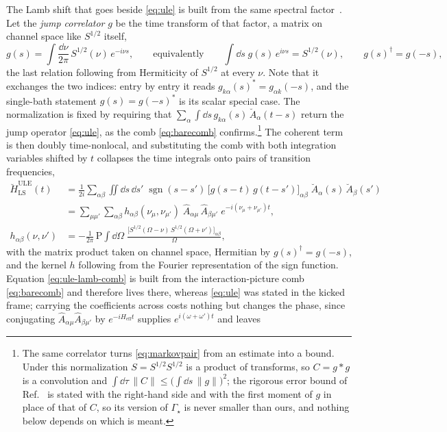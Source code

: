 \documentclass[a4paper,11pt]{article}
\newcommand{\eff}{\mathrm{eff}}
\begin{document}
The Lamb shift that goes beside \eqref{eq:ule} is built from the same spectral factor~\cite{Nathan2020Universal}. Let the \emph{jump correlator} $g$ be the time transform of that factor, a matrix on channel space like $S^{1/2}$ itself,
\begin{equation}\label{eq:jumpcorrelator}
  g(s) = \int\!\frac{\dd\nu}{2\pi}\,S^{1/2}(\nu)\,e^{-i\nu s},
  \qquad\text{equivalently}\qquad
  \int\!\dd s\; g(s)\,e^{i\nu s} = S^{1/2}(\nu),
  \qquad
  g(s)^\dagger = g(-s),
\end{equation}
the last relation following from Hermiticity of $S^{1/2}$ at every $\nu$. Note that it exchanges the two indices: entry by entry it reads $g_{k\alpha}(s)^* = g_{\alpha k}(-s)$, and the single-bath statement $g(s) = g(-s)^*$ is its scalar special case. The normalization is fixed by requiring that $\sum_\alpha\int\dd s\,g_{k\alpha}(s)\,\breve A_\alpha(t-s)$ return the jump operator \eqref{eq:ule}, as the comb \eqref{eq:barecomb} confirms.\footnote{The same correlator turns \eqref{eq:markovpair} from an estimate into a bound. Under this normalization $S = S^{1/2}S^{1/2}$ is a product of transforms, so $C = g*g$ is a convolution and $\int\dd\tau\,\lVert C\rVert \le \big(\int\dd s\,\lVert g\rVert\big)^2$; the rigorous error bound of Ref.~\cite{Nathan2020Universal} is stated with the right-hand side and with the first moment of $g$ in place of that of $C$, so its version of $\Gamma_{\!\star}$ is never smaller than ours, and nothing below depends on which is meant.} The coherent term is then doubly time-nonlocal, and substituting the comb with both integration variables shifted by $t$ collapses the time integrals onto pairs of transition frequencies,
\begin{equation}\label{eq:ule-lamb-comb}
  \begin{aligned}
  \breve H^{\mathrm{ULE}}_{\mathrm{LS}}(t)
  &= \frac{1}{2i}\sum_{\alpha\beta}\iint\!\dd s\,\dd s'\;
    \operatorname{sgn}(s-s')\,\big[g(s-t)\,g(t-s')\big]_{\alpha\beta}\;
    \breve A_\alpha(s)\,\breve A_\beta(s')\\
  &= \sum_{\mu\mu'}\sum_{\alpha\beta}
    h_{\alpha\beta}(\nu_\mu,\nu_{\mu'})\;\hat A_{\alpha\mu}\,\hat A_{\beta\mu'}\;
    e^{-i(\nu_\mu+\nu_{\mu'})t},\\
  h_{\alpha\beta}(\nu,\nu') &= -\frac{1}{2\pi}\,\mathrm{P}\!\!\int\!\dd\Omega\;
    \frac{\big[S^{1/2}(\Omega-\nu)\,S^{1/2}(\Omega+\nu')\big]_{\alpha\beta}}{\Omega} ,
  \end{aligned}
\end{equation}
with the matrix product taken on channel space, Hermitian by $g(s)^\dagger = g(-s)$, and the kernel $h$ following from the Fourier representation of the sign function. Equation \eqref{eq:ule-lamb-comb} is built from the interaction-picture comb \eqref{eq:barecomb} and therefore lives there, whereas \eqref{eq:ule} was stated in the kicked frame; carrying the coefficients across costs nothing but changes the phase, since conjugating $\hat A_{\alpha\mu}\hat A_{\beta\mu'}$ by $e^{-iH_\eff t}$ supplies $e^{i(\omega+\omega')t}$ and leaves
\end{document}
